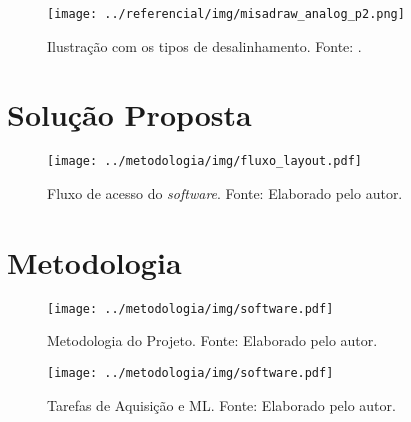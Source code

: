 \documentclass[a4paper]{ifacconf}
\begin{document}
\begin{figure}[h!]
  \begin{center}
      \texttt{[image: ../referencial/img/misadraw\_analog\_p2.png]}
  \end{center}
  \caption{Ilustração com os tipos de desalinhamento. Fonte: \cite{Sopcik2019}.}
  \label{fig:misadraw_analog_p2}
\end{figure}


\section{Solução Proposta}


\begin{figure}[h!]
  \begin{center}
      \texttt{[image: ../metodologia/img/fluxo\_layout.pdf]}
  \end{center}
  \caption{Fluxo de acesso do \textit{software}. Fonte: Elaborado pelo autor.} 
  \label{fig:fluxo_software}
\end{figure}



\section{Metodologia}



\begin{figure}[h!]
  \begin{center}
      \texttt{[image: ../metodologia/img/software.pdf]}
      \caption{Metodologia do Projeto. Fonte: Elaborado pelo autor.}
  \end{center} 
  \label{fig:metodologia}
\end{figure}

\begin{figure}[h!]
  \caption{Tarefas de Aquisição e ML. Fonte: Elaborado pelo autor.}
  \begin{center}
      \texttt{[image: ../metodologia/img/software.pdf]}
  \end{center}
  \label{fig:tarefa_aq_ml}
\end{figure}
\end{document}
